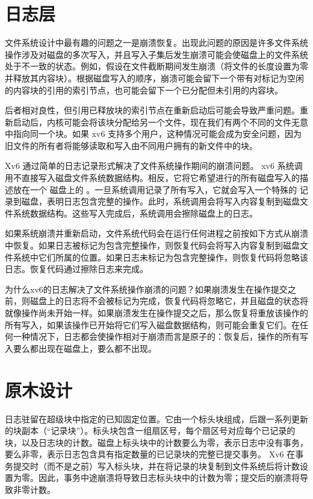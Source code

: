 \documentclass[UTF8]{article}
\begin{document}
    \section{日志层  }     

文件系统设计中最有趣的问题之一是崩溃恢复。出现此问题的原因是许多文件系统操作涉及对磁盘的多次写入，并且写入子集后发生崩溃可能会使磁盘上的文件系统处于不一致的状态。例如，假设在文件截断期间发生崩溃（将文件的长度设置为零并释放其内容块）。根据磁盘写入的顺序，崩溃可能会留下一个带有对标记为空闲的内容块的引用的索引节点，也可能会留下一个已分配但未引用的内容块。  

后者相对良性，但引用已释放块的索引节点在重新启动后可能会导致严重问题。重新启动后，内核可能会将该块分配给另一个文件，现在我们有两个不同的文件无意中指向同一个块。如果 xv6 支持多个用户，这种情况可能会成为安全问题，因为旧文件的所有者将能够读取和写入由不同用户拥有的新文件中的块。  

Xv6 通过简单的日志记录形式解决了文件系统操作期间的崩溃问题。 xv6 系统调用不直接写入磁盘文件系统数据结构。相反，它将它希望进行的所有磁盘写入的描述放在一个
 磁盘上的       。一旦系统调用记录了所有写入，它就会写入一个特殊的
        记录到磁盘，表明日志包含完整的操作。此时，系统调用会将写入内容复制到磁盘文件系统数据结构。这些写入完成后，系统调用会擦除磁盘上的日志。  

如果系统崩溃并重新启动，文件系统代码会在运行任何进程之前按如下方式从崩溃中恢复。如果日志被标记为包含完整操作，则恢复代码会将写入内容复制到磁盘文件系统中它们所属的位置。如果日志未标记为包含完整操作，则恢复代码将忽略该日志。恢复代码通过擦除日志来完成。  

为什么xv6的日志解决了文件系统操作崩溃的问题？如果崩溃发生在操作提交之前，则磁盘上的日志将不会被标记为完成，恢复代码将忽略它，并且磁盘的状态将就像操作尚未开始一样。如果崩溃发生在操作提交之后，那么恢复将重放该操作的所有写入，如果该操作已开始将它们写入磁盘数据结构，则可能会重复它们。在任何一种情况下，日志都会使操作相对于崩溃而言是原子的：恢复后，操作的所有写入要么都出现在磁盘上，要么都不出现。
    \section{原木设计  }     

日志驻留在超级块中指定的已知固定位置。它由一个标头块组成，后跟一系列更新的块副本（“记录块”）。标头块包含一组扇区号，每个扇区号对应每个已记录的块，以及日志块的计数。磁盘上标头块中的计数要么为零，表示日志中没有事务，要么非零，表示日志包含具有指定数量的已记录块的完整已提交事务。 Xv6 在事务提交时（而不是之前）写入标头块，并在将记录的块复制到文件系统后将计数设置为零。因此，事务中途崩溃将导致日志标头块中的计数为零；提交后的崩溃将导致非零计数。  
\end{document}

